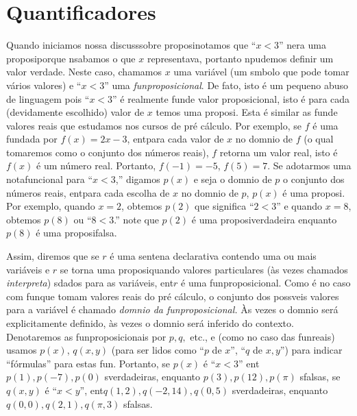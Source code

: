 \section{Quantificadores}\label{quantificadores}

Quando iniciamos nossa discuss\ao sobre proposi\coes notamos que ``$x<3$'' n\ao era uma proposi\cao porque n\ao sab\ih amos o que $x$ representava, portanto n\ao pudemos definir um valor verdade. Neste caso, chamamos $x$ uma vari\'avel (um s\ih mbolo que pode tomar v\'arios valores) e ``$x<3$'' uma \emph{fun\cao proposicional}. De fato, isto \'e um pequeno abuso de linguagem pois ``$x<3$'' \'e realmente fun\cao de valor proposicional, isto \'e para cada (devidamente escolhido) valor de $x$ temos uma proposi\caoi. Esta \'e similar as fun\coes de valores reais que estudamos nos cursos de pr\'e c\'alculo. Por exemplo, se $f$ \'e uma fun\cao dada por $f(x)=2x-3$, ent\ao para cada valor de $x$ no dom\ih nio de $f$ (o qual tomaremos como o conjunto dos n\'umeros reais), $f$ retorna um valor real, isto \'e $f(x)$ \'e um n\'umero real. Portanto, $f(-1)=-5$, $f(5)=7$. Se adotarmos uma nota\cao funcional para ``$x<3$,'' digamos $p(x)$ e seja o dom\ih nio de $p$ o conjunto dos n\'umeros reais, ent\ao para cada escolha de $x$ no dom\ih nio de $p$, $p(x)$ \'e uma proposi\caoi. Por exemplo, quando $x=2$, obtemos $p(2)$ que significa ``$2<3$'' e quando $x=8$, obtemos $p(8)$ ou ``$8<3$.'' note que $p(2)$ \'e uma proposi\cao verdadeira enquanto $p(8)$ \'e uma proposi\cao falsa. 

Assim, diremos que se $r$ \'e uma senten\cc a declarativa contendo uma ou mais vari\'aveis e $r$ se torna uma proposi\cao quando valores particulares (\`as vezes chamados \emph{interpreta\cois}) s\ao dados para as vari\'aveis, ent\ao $r$ \'e uma fun\cao proposicional. Como \'e no caso com fun\coes que tomam valores reais do pr\'e c\'alculo, o conjunto dos poss\ih veis valores para a vari\'avel \'e chamado \emph{dom\ih nio da fun\cao proposicional.} \`As vezes o dom\ih nio ser\'a explicitamente definido, \`as vezes o dom\ih nio ser\'a inferido do contexto. Denotaremos as fun\coes proposicionais por $p,q,$ etc., e (como no caso das fun\coes reais) usamos $p(x)$, $q(x,y)$ (para ser lidos como ``$p$ de $x$'', ``$q$ de $x,y$'') para indicar ``f\'ormulas'' para estas fun\cois. Portanto, se $p(x)$ \'e ``$x<3$'' ent\ao $p(1), p(-7), p(0)$ s\ao verdadeiras, enquanto $p(3), p(12), p(\pi)$ s\ao falsas, se $q(x,y)$ \'e ``$x<y$'', ent\ao $q(1,2), q(-2,14), q(0,5)$ s\ao verdadeiras, enquanto $q(0,0), q(2,1), q(\pi,3)$ s\ao falsas. 

